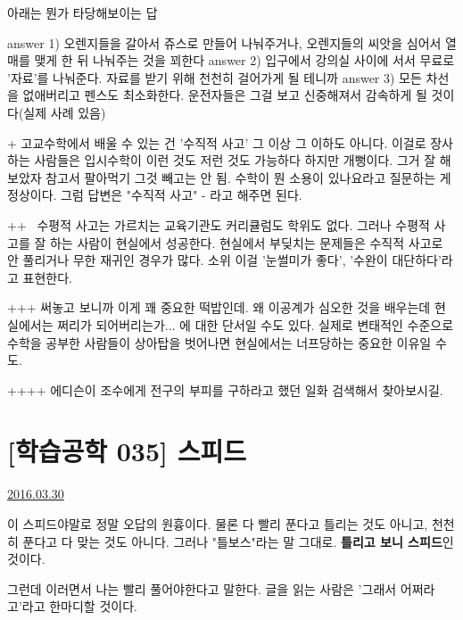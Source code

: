 아래는 뭔가 타당해보이는 답
\vspace{5mm}

answer 1) 오렌지들을 갈아서 쥬스로 만들어 나눠주거나, 오렌지들의 씨앗을 심어서 열매를 맺게 한 뒤 나눠주는 것을 꾀한다
answer 2) 입구에서 강의실 사이에 서서 무료로 '자료'를 나눠준다. 자료를 받기 위해 천천히 걸어가게 될 테니까
answer 3) 모든 차선을 없애버리고 펜스도 최소화한다. 운전자들은 그걸 보고 신중해져서 감속하게 될 것이다(실제 사례 있음)
\vspace{5mm}

+ 고교수학에서 배울 수 있는 건 '수직적 사고' 그 이상 그 이하도 아니다.
이걸로 장사하는 사람들은 입시수학이 이런 것도 저런 것도 가능하다 하지만 개뻥이다. 그거 잘 해보았자 참고서 팔아먹기 그것 빼고는 안 됨.
수학이 뭔 소용이 있나요라고 질문하는 게 정상이다. 그럼 답변은 "수직적 사고" - 라고 해주면 된다.
\vspace{5mm}

++  수평적 사고는 가르치는 교육기관도 커리큘럼도 학위도 없다.
그러나 수평적 사고를 잘 하는 사람이 현실에서 성공한다. 현실에서 부딪치는 문제들은 수직적 사고로 안 풀리거나 무한 재귀인 경우가 많다.
소위 이걸 '눈썰미가 좋다', '수완이 대단하다'라고 표현한다.
\vspace{5mm}

+++ 써놓고 보니까 이게 꽤 중요한 떡밥인데.
왜 이공계가 심오한 것을 배우는데 현실에서는 쩌리가 되어버리는가... 에 대한 단서일 수도 있다.
실제로 변태적인 수준으로 수학을 공부한 사람들이 상아탑을 벗어나면 현실에서는 너프당하는 중요한 이유일 수도.
\vspace{5mm}

++++ 에디슨이 조수에게 전구의 부피를 구하라고 했던 일화 검색해서 찾아보시길.
\vspace{5mm}






\section{[학습공학 035] 스피드}
\href{https://www.kockoc.com/Apoc/702978}{2016.03.30}

\vspace{5mm}

이 스피드야말로 정말 오답의 원흉이다.
물론 다 빨리 푼다고 틀리는 것도 아니고, 천천히 푼다고 다 맞는 것도 아니다.
그러나 "틀보스"라는 말 그대로. \textbf{틀리고 보니 스피드}인 것이다.
\vspace{5mm}

그런데 이러면서 나는 빨리 풀어야한다고 말한다. 글을 읽는 사람은 '그래서 어쩌라고'라고 한마디할 것이다.
\vspace{5mm}

